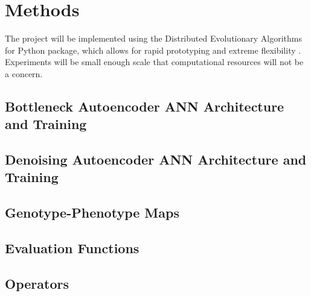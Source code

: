 \section{Methods} \label{sec:methods}

The project will be implemented using the Distributed Evolutionary Algorithms for Python package, which allows for rapid prototyping and extreme flexibility \cite{fortin2012deap}.
Experiments will be small enough scale that computational resources will not be a concern.


\subsection{Bottleneck Autoencoder ANN Architecture and Training}

\subsection{Denoising Autoencoder ANN Architecture and Training}

\subsection{Genotype-Phenotype Maps}

\subsection{Evaluation Functions}

\subsection{Operators}

